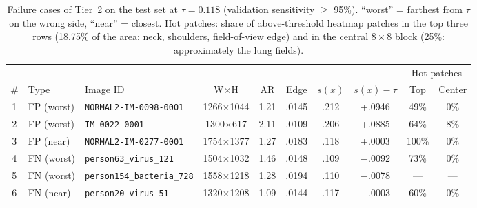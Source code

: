 \begin{table}[t]
\centering
\footnotesize
\setlength{\tabcolsep}{3.5pt}
\begin{adjustbox}{max width=\textwidth}
\begin{tabular}{cllccccccc}
\toprule
 & & & & & & & & \multicolumn{2}{c}{Hot patches} \\
\cmidrule(lr){9-10}
\# & Type & Image ID & W$\times$H & AR & Edge & $s(x)$ & $s(x)-\tau$ & Top & Center \\
\midrule
1 & FP (worst) & \texttt{NORMAL2-IM-0098-0001} & 1266$\times$1044 & 1.21 & .0145 & .212 & +.0946 & 49\% & 0\% \\
2 & FP (worst) & \texttt{IM-0022-0001} & 1300$\times$617 & 2.11 & .0109 & .206 & +.0885 & 64\% & 8\% \\
3 & FP (near) & \texttt{NORMAL2-IM-0277-0001} & 1754$\times$1377 & 1.27 & .0183 & .118 & +.0003 & 100\% & 0\% \\
4 & FN (worst) & \texttt{person63\_virus\_121} & 1504$\times$1032 & 1.46 & .0148 & .109 & $-$.0092 & 73\% & 0\% \\
5 & FN (worst) & \texttt{person154\_bacteria\_728} & 1558$\times$1218 & 1.28 & .0194 & .110 & $-$.0078 & --- & --- \\
6 & FN (near) & \texttt{person20\_virus\_51} & 1320$\times$1208 & 1.09 & .0144 & .117 & $-$.0003 & 60\% & 0\% \\
\bottomrule
\end{tabular}
\end{adjustbox}
\caption{Failure cases of Tier~2 on the test set at $\tau=0.118$ (validation sensitivity $\geq$ 95\%). ``worst'' = farthest from $\tau$ on the wrong side, ``near'' = closest. Hot patches: share of above-threshold heatmap patches in the top three rows (18.75\% of the area: neck, shoulders, field-of-view edge) and in the central $8{\times}8$ block (25\%: approximately the lung fields).}
\label{tab:cases}
\end{table}
